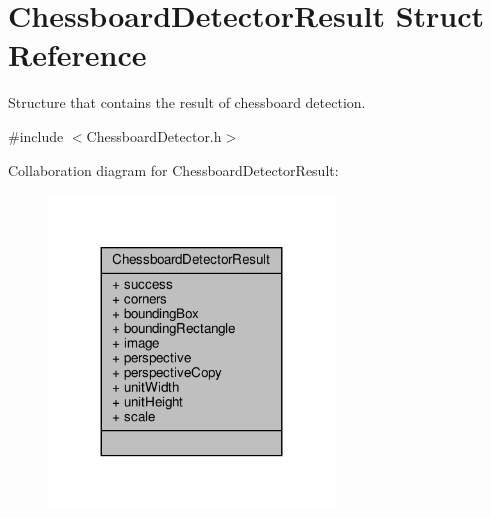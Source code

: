 \hypertarget{struct_chessboard_detector_result}{}\section{Chessboard\+Detector\+Result Struct Reference}
\label{struct_chessboard_detector_result}


Structure that contains the result of chessboard detection.  




{\ttfamily \#include $<$Chessboard\+Detector.\+h$>$}



Collaboration diagram for Chessboard\+Detector\+Result\+:\nopagebreak
\begin{figure}[H]
\begin{center}
\leavevmode
\includegraphics[width=215pt]{struct_chessboard_detector_result__coll__graph}
\end{center}
\end{figure}
